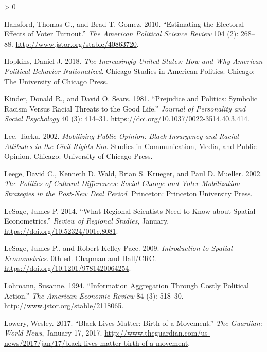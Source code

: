 \documentclass[
  12pt,
]{article}
\newlength{\cslhangindent}
\newenvironment{CSLReferences}[2] %
 {%
  \setlength{\parindent}{0pt}
  \ifodd #1 \everypar{\setlength{\hangindent}{\cslhangindent}}\ignorespaces\fi
  \ifnum #2 > 0
  \setlength{\parskip}{#2\baselineskip}
  \fi
 }%
 {}
\begin{document}
\begin{CSLReferences}{1}{0}
\leavevmode\hypertarget{ref-Hansford2010}{}%
Hansford, Thomas G., and Brad T. Gomez. 2010. {``Estimating the {Electoral Effects} of {Voter Turnout}.''} \emph{The American Political Science Review} 104 (2): 268--88. \url{http://www.jstor.org/stable/40863720}.

\leavevmode\hypertarget{ref-Hopkins2018}{}%
Hopkins, Daniel J. 2018. \emph{The Increasingly {United States}: How and Why {American} Political Behavior Nationalized}. Chicago Studies in {American} Politics. {Chicago}: {The University of Chicago Press}.

\leavevmode\hypertarget{ref-Kinder1981}{}%
Kinder, Donald R., and David O. Sears. 1981. {``Prejudice and Politics: {Symbolic} Racism Versus Racial Threats to the Good Life.''} \emph{Journal of Personality and Social Psychology} 40 (3): 414--31. \url{https://doi.org/10.1037/0022-3514.40.3.414}.

\leavevmode\hypertarget{ref-Lee2002}{}%
Lee, Taeku. 2002. \emph{Mobilizing Public Opinion: {Black} Insurgency and Racial Attitudes in the Civil Rights Era}. Studies in Communication, Media, and Public Opinion. {Chicago}: {University of Chicago Press}.

\leavevmode\hypertarget{ref-Leege2002}{}%
Leege, David C., Kenneth D. Wald, Brian S. Krueger, and Paul D. Mueller. 2002. \emph{The Politics of Cultural Differences: Social Change and Voter Mobilization Strategies in the Post-{New Deal} Period}. {Princeton}: {Princeton University Press}.

\leavevmode\hypertarget{ref-LeSage2014}{}%
LeSage, James P. 2014. {``What {Regional Scientists Need} to {Know} about {Spatial Econometrics}.''} \emph{Review of Regional Studies}, January. \url{https://doi.org/10.52324/001c.8081}.

\leavevmode\hypertarget{ref-LeSage2009}{}%
LeSage, James P., and Robert Kelley Pace. 2009. \emph{Introduction to {Spatial Econometrics}}. 0th ed. {Chapman and Hall/CRC}. \url{https://doi.org/10.1201/9781420064254}.

\leavevmode\hypertarget{ref-Lohmann1994}{}%
Lohmann, Susanne. 1994. {``Information {Aggregation Through Costly Political Action}.''} \emph{The American Economic Review} 84 (3): 518--30. \url{http://www.jstor.org/stable/2118065}.

\leavevmode\hypertarget{ref-Lowery2017}{}%
Lowery, Wesley. 2017. {``Black {Lives Matter}: Birth of a Movement.''} \emph{The Guardian: World News}, January 17, 2017. \url{http://www.theguardian.com/us-news/2017/jan/17/black-lives-matter-birth-of-a-movement}.


\end{CSLReferences}
\end{document}
